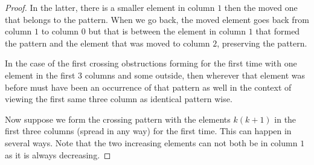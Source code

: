 \begin{proof}
In the latter, there is a smaller element in column $1$ then the moved one that belongs to the pattern. When we go back, the moved element goes back from column $1$ to column $0$ but that is between the element in column $1$ that formed the pattern and the element that was moved to column $2$, preserving the pattern.

\begin{center}
\end{center}

In the case of the first crossing obstructions forming for the first time with one element in the first 3 columns and some outside, then wherever that element was before must have been an occurrence of that pattern as well in the context of viewing the first same three column as identical pattern wise.

Now suppose we form the crossing pattern with the elements $k(k+1)$ in the first three columns (spread in any way) for the first time. This can happen in several ways. Note that the two increasing elements can not both be in column $1$ as it is always decreasing.


\end{proof}
